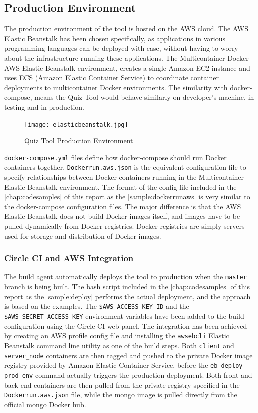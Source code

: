 \subsection{Production Environment}
\label{subsection:productionenv}
The production environment of the tool is hosted on the AWS cloud. The AWS Elastic Beanstalk
has been chosen specifically, as applications in
various programming languages can be deployed with ease, without having to worry about
the infrastructure running these applications\cite{37}. The Multicontainer Docker AWS Elastic
Beanstalk\cite{38} environment, creates a single Amazon EC2\cite{39}
instance and uses ECS (Amazon Elastic Container Service)\cite{40} to coordinate container deployments to
multicontainer Docker environments. The similarity with docker-compose, means the Quiz Tool
would behave similarly on developer's machine, in testing and in production.

\begin{figure}[h!]
    \centering
    \texttt{[image: elasticbeanstalk.jpg]}
    \caption{Quiz Tool Production Environment}
    \label{fig:ebs}
\end{figure}

\texttt{docker-compose.yml} files define how docker-compose should run Docker containers together.
\texttt{Dockerrun.aws.json} is the equivalent configuration file to specify relationships between Docker
containers running in the Multicontainer Elastic Beanstalk environment. The format of the config file
included in the \autoref{chap:codesamples} of this report
as the \autoref{sample:dockerrunaws} is very
similar to the docker-compose configuration files. The major
difference is that the AWS Elastic Beanstalk does not build Docker images itself, and images have
to be pulled dynamically from Docker registries. Docker registries are simply servers used for storage and
distribution of Docker images.

\subsubsection{Circle CI and AWS Integration}
The build agent automatically deploys the tool to production when the \texttt{master}
branch is being built. The bash script included in the \autoref{chap:codesamples} of this report
as the \autoref{sample:deploy} performs the actual deployment, and the
approach is based on the examples\cite{41}\cite{42}.
The \texttt{\$AWS\_ACCESS\_KEY\_ID} and the \texttt{\$AWS\_SECRET\_ACCESS\_KEY} environment
variables have been added to the build configuration using the Circle CI web panel.
The integration has been achieved by creating an AWS profile config file and installing
the \texttt{awsebcli} Elastic Beanstalk command line utility as one of the build steps.
Both \texttt{client} and \texttt{server\_node} containers are then tagged and pushed
to the private Docker image registry provided by Amazon Elastic Container Service, before
the \texttt{eb deploy prod-env} command actually triggers the production deployment.
Both front and back end containers are then pulled from the private registry specified
in the \texttt{Dockerrun.aws.json} file, while the mongo image is pulled directly from
the official mongo Docker hub.

